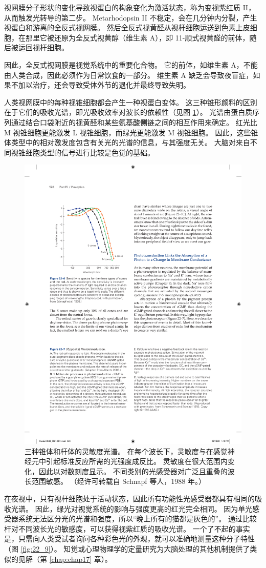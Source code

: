 视网膜分子形状的变化导致视蛋白的构象变化为激活状态，称为变视紫红质 II，从而触发光转导的第二步。 
Metarhodopsin II 不稳定，会在几分钟内分裂，产生视蛋白和游离的全反式视网膜。 
然后全反式视黄醛从视杆细胞运送到色素上皮细胞，在那里它被还原为全反式视黄醇（维生素 A），即 11-顺式视黄醛的前体，随后被运回视杆细胞。


因此，全反式视网膜是视觉系统中的重要化合物。 
它的前体，如维生素 A，不能由人类合成，因此必须作为日常饮食的一部分。 
维生素 A 缺乏会导致夜盲症，如果不加以治疗，还会导致受体外节的退化并最终导致失明。


人类视网膜中的每种视锥细胞都会产生一种视蛋白变体。 
这三种锥形颜料的区别在于它们的吸收光谱，即光吸收效率对波长的依赖性（见图 \ref{fig:22_6}）。 
光谱由蛋白质序列通过结合口袋附近的视黄醛和某些氨基酸侧链之间的相互作用来确定。 
红光比 M 视锥细胞更能激发 L 视锥细胞，而绿光更能激发 M 视锥细胞。 
因此，这些锥体类型中的相对激发度包含有关光的光谱的信息，与其强度无关。 
大脑对来自不同视锥细胞类型的信号进行比较是色觉的基础。

\begin{figure}[htbp]
	\centering
	\includegraphics[width=0.5\linewidth]{chap22/fig_22_6}
	\caption{三种锥体和杆体的灵敏度光谱。 
		在每个波长下，灵敏度与在感觉神经元中引起标准反应所需的光强度成反比。 
		灵敏度在很大范围内变化，因此以对数刻度显示。 
		不同类别的光感受器对广泛且重叠的波长范围敏感。 （经许可转载自 Schnapf 等人，1988 年。）}
	\label{fig:22_6}
\end{figure}


在夜视中，只有视杆细胞处于活动状态，因此所有功能性光感受器都具有相同的吸收光谱。 
因此，绿光对视觉系统的影响与强度更高的红光完全相同。 
因为单光感受器系统无法区分光的光谱和强度，所以“晚上所有的猫都是灰色的”。 
通过比较杆对不同波长光的敏感度，可以获得视紫红质的吸收光谱。 
一个了不起的事实是，只需向人类受试者询问各种彩色光的外观，就可以准确地测量这种分子特性（图 \ref{fig:22_9}）。 
知觉或心理物理学的定量研究为大脑处理的其他机制提供了类似的见解（第 \ref{chap:chap17} 章）。

